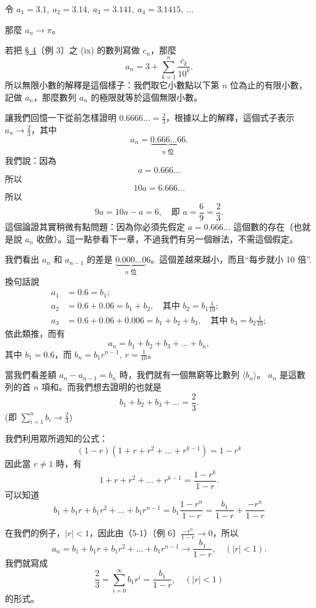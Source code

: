 令 $a_1=3.1,\ a_2=3.14,\ a_3=3.141,\ a_4=3.1415,\ \dots$

那麼 $a_n \to \pi$。

若把 \hyperref[sec:b2_2-4]{§ 4}〔例 3〕之 (ix) 的數列寫做 $c_n$，那麼
\[
a_n = 3 + \sum_{k=1}^n \frac{c_k}{10^k}.
\]
所以無限小數的解釋是這個樣子：我們取它小數點以下第 $n$ 位為止的有限小數，記做 $a_n$，那麼數列 $a_n$ 的極限就等於這個無限小數。

讓我們回憶一下從前怎樣證明 $0.6666\dots = \frac{2}{3}$，根據以上的解釋，這個式子表示 $a_n \to \frac{2}{3}$，其中
\[
a_n = \underbrace{0.666\dots 66}_{n\text{ 位}}.
\]
我們說：因為
\[
a = 0.666\dots
\]
所以
\[
10a = 6.666\dots
\]
所以
\[
9a = 10a-a = 6,\quad \text{即 } a = \frac{6}{9} = \frac{2}{3}.
\]
這個論證其實稍微有點問題：因為你必須先假定 $a=0.666\dots$ 這個數的存在（也就是說 $a_n$ 收斂）。這一點參看下一章，不過我們有另一個辦法，不需這個假定。

我們看出 $a_n$ 和 $a_{n-1}$ 的差是 $\underbrace{0.000\dots 0}_{n\text{ 位}}6$。這個差越來越小，而且“每步就小 10 倍”. 換句話說
\begin{align*}
a_1 &= 0.6 = b_1; \\
a_2 &= 0.6+0.06 = b_1+b_2,\quad \text{其中 } b_2 = b_1 \frac{1}{10}; \\
a_3 &= 0.6+0.06+0.006 = b_1+b_2+b_3,\quad \text{其中 } b_3 = b_2 \frac{1}{10};
\end{align*}
依此類推，而有
\[
a_n = b_1+b_2+b_3+\dots+b_n,
\]
其中 $b_1 = 0.6$，而 $b_n = b_1 r^{n-1},\ r = \frac{1}{10}$。

當我們看差額 $a_n - a_{n-1} = b_n$ 時，我們就有一個無窮等比數列 $\langle b_n \rangle$。 $a_n$ 是這數列的首 $n$ 項和。而我們想去證明的也就是
\[
b_1+b_2+b_3+\dots = \frac{2}{3}.
\]
(即 $\sum_{i=1}^n b_i \to \frac{2}{3}$)

我們利用眾所週知的公式：
\[
(1-r)(1+r+r^2+\dots+r^{k-1}) = 1-r^k
\]
因此當 $r\ne 1$ 時，有
\[
1+r+r^2+\dots+r^{k-1} = \frac{1-r^k}{1-r}.
\]
可以知道
\begin{equation}\label{eq:b2_ch2_geom_sum}\tag{1}
b_1+b_1 r+b_1 r^2+\dots+b_1 r^{n-1} = b_1 \frac{1-r^n}{1-r} = \frac{b_1}{1-r} + \frac{-r^n}{1-r}
\end{equation}
\label{note:b2-ch2-p50-eq1-b1}

在我們的例子，$|r|<1$，因此由（5-1）〔例 6〕$\frac{-r^n}{1-r} \to 0$\label{note:b2-ch2-p51-lim-rn}，所以
\[
a_n = b_1+b_1 r+b_1 r^2+\dots+b_1 r^{n-1} \to \frac{b_1}{1-r}, \quad (|r|<1).
\]
我們就寫成
\begin{equation}\label{eq:b2_ch2_geom_series_23}\tag{2}
\frac{2}{3} = \sum_{i=0}^\infty b_1 r^i = \frac{b_1}{1-r},\quad (|r|<1)
\end{equation}
的形式。

